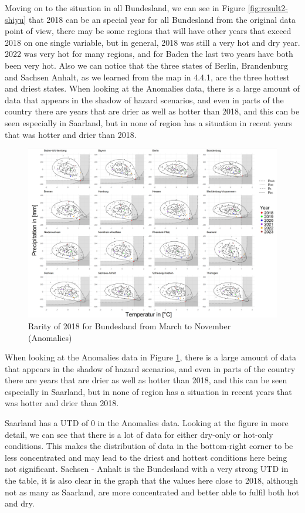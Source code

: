 \documentclass[
]{krantz}
\begin{document}
Moving on to the situation in all Bundesland, we can see in Figure \ref{fig:result2-shiyu} that 2018 can be an special year for all Bundesland from the original data point of view, there may be some regions that will have other years that exceed 2018 on one single variable, but in general, 2018 was still a very hot and dry year. 2022 was very hot for many regions, and for Baden the last two years have both been very hot. Also we can notice that the three states of Berlin, Brandenburg and Sachsen Anhalt, as we learned from the map in 4.4.1, are the three hottest and driest states.
When looking at the Anomalies data, there is a large amount of data that appears in the shadow of hazard scenarios, and even in parts of the country there are years that are drier as well as hotter than 2018, and this can be seen especially in Saarland, but in none of region has a situation in recent years that was hotter and drier than 2018.

\begin{figure}

{\centering \includegraphics[width=0.8\linewidth]{work/03-compounds/figures/RESULTS/resultMtoNA} 

}

\caption{Rarity of 2018 for Bundesland from March to November (Anomalies)}\label{fig:result3-shiyu}
\end{figure}

When looking at the Anomalies data in Figure \ref{fig:result3-shiyu}, there is a large amount of data that appears in the shadow of hazard scenarios, and even in parts of the country there are years that are drier as well as hotter than 2018, and this can be seen especially in Saarland, but in none of region has a situation in recent years that was hotter and drier than 2018.

Saarland has a UTD of 0 in the Anomalies data. Looking at the figure in more detail, we can see that there is a lot of data for either dry-only or hot-only conditions. This makes the distribution of data in the bottom-right corner to be less concentrated and may lead to the driest and hottest conditions here being not significant. Sachsen - Anhalt is the Bundesland with a very strong UTD in the table, it is also clear in the graph that the values here close to 2018, although not as many as Saarland, are more concentrated and better able to fulfil both hot and dry.
\end{document}
